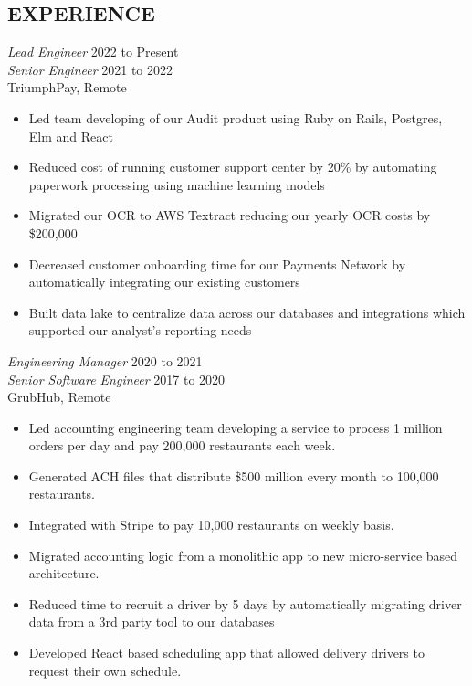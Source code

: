 \documentclass[line]{style}
\begin{document}
\newsectionwidth{0in}

\address{michaelcdalton@gmail.com}
\address{linkedin.com/in/michaelcdalton}

\begin{resume}

\section{EXPERIENCE}

{\sl Lead Engineer} \hfill 2022 to Present \\
{\sl Senior Engineer} \hfill 2021 to 2022 \\
TriumphPay, Remote
\begin{itemize} \itemsep -2pt
\item Led team developing of our Audit product using Ruby on Rails, Postgres, Elm and React
\item Reduced cost of running customer support center by 20\% by automating paperwork processing using machine learning models
\item Migrated our OCR to AWS Textract reducing our yearly OCR costs by \$200,000
\item Decreased customer onboarding time for our Payments Network by automatically integrating our existing customers
\item Built data lake to centralize data across our databases and integrations which supported our analyst's reporting needs
\end{itemize}

{\sl Engineering Manager} \hfill 2020 to 2021 \\
{\sl Senior Software Engineer} \hfill 2017 to 2020 \\
GrubHub, Remote
\begin{itemize} \itemsep -2pt
\item Led accounting engineering team developing a service to process 1 million orders per day and pay 200,000 restaurants each week.
\item Generated ACH files that distribute \$500 million every month to 100,000 restaurants.
\item Integrated with Stripe to pay 10,000 restaurants on weekly basis.
\item Migrated accounting logic from a monolithic app to new micro-service based architecture.
\item Reduced time to recruit a driver by 5 days by automatically migrating driver data from a 3rd party tool to our databases
\item Developed React based scheduling app that allowed delivery drivers to request their own schedule.
\end{itemize}


\end{resume}
\end{document}
